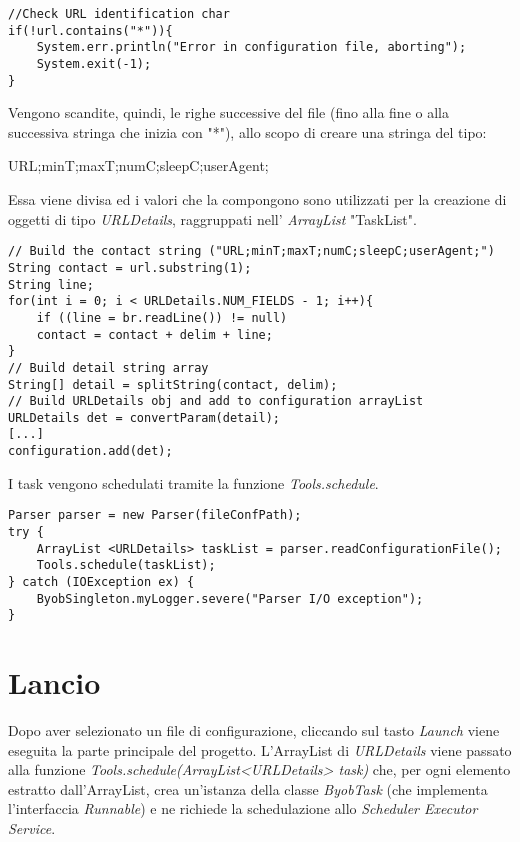 \begin{lstlisting}
//Check URL identification char
if(!url.contains("*")){
	System.err.println("Error in configuration file, aborting");
	System.exit(-1);
}
\end{lstlisting}

Vengono scandite, quindi, le righe successive del file (fino alla fine o alla successiva stringa che inizia con "*"), allo scopo di creare una stringa del tipo:

\vspace{0.5cm}
\begin{normalsize}
	URL;minT;maxT;numC;sleepC;userAgent;
\end{normalsize}

\vspace{0.5cm}
Essa viene divisa ed i valori che la compongono sono utilizzati per la creazione di oggetti di tipo \textit{URLDetails}, raggruppati nell' \textit{ArrayList} "TaskList".

\vspace{0.5cm}
\begin{lstlisting}
// Build the contact string ("URL;minT;maxT;numC;sleepC;userAgent;")
String contact = url.substring(1);
String line;
for(int i = 0; i < URLDetails.NUM_FIELDS - 1; i++){
	if ((line = br.readLine()) != null)
	contact = contact + delim + line;
}
// Build detail string array
String[] detail = splitString(contact, delim);
// Build URLDetails obj and add to configuration arrayList
URLDetails det = convertParam(detail);
[...]
configuration.add(det);
\end{lstlisting}


I task vengono schedulati tramite la funzione \textit{Tools.schedule}.

\vspace{0.5cm}
\begin{lstlisting}
Parser parser = new Parser(fileConfPath);
try {
	ArrayList <URLDetails> taskList = parser.readConfigurationFile();
	Tools.schedule(taskList);
} catch (IOException ex) {
	ByobSingleton.myLogger.severe("Parser I/O exception");
}
\end{lstlisting}


\section{Lancio}
Dopo aver selezionato un file di configurazione, cliccando sul tasto \textit{Launch} viene eseguita la parte principale del progetto.
L'ArrayList di \textit{URLDetails} viene passato alla funzione \textit{Tools.schedule(ArrayList<URLDetails> task)} che, per ogni elemento estratto dall'ArrayList, crea un'istanza della classe \textit{ByobTask} (che implementa l'interfaccia \textit{Runnable}) e ne richiede la schedulazione allo \textit{Scheduler Executor Service}.

